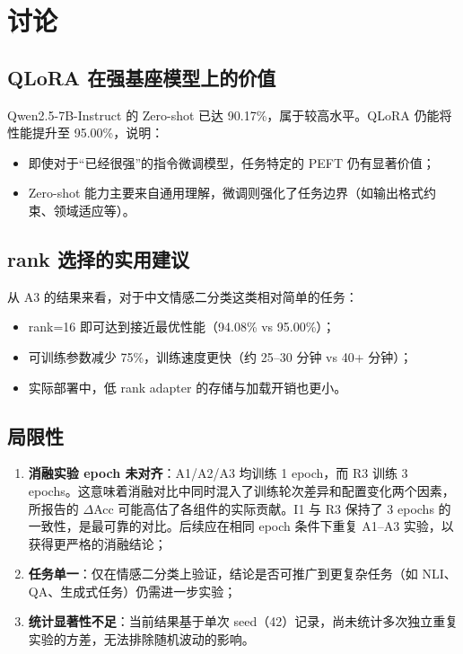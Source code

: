 \documentclass[12pt,a4paper]{article}
\begin{document}
\section{讨论}

\subsection{QLoRA 在强基座模型上的价值}

Qwen2.5-7B-Instruct 的 Zero-shot 已达 90.17\%，属于较高水平。QLoRA 仍能将性能提升至 95.00\%，说明：
\begin{itemize}[leftmargin=2em]
  \item 即使对于``已经很强''的指令微调模型，任务特定的 PEFT 仍有显著价值；
  \item Zero-shot 能力主要来自通用理解，微调则强化了任务边界（如输出格式约束、领域适应等）。
\end{itemize}

\subsection{rank 选择的实用建议}

从 A3 的结果来看，对于中文情感二分类这类相对简单的任务：
\begin{itemize}[leftmargin=2em]
  \item rank=16 即可达到接近最优性能（94.08\% vs 95.00\%）；
  \item 可训练参数减少 75\%，训练速度更快（约 25--30 分钟 vs 40+ 分钟）；
  \item 实际部署中，低 rank adapter 的存储与加载开销也更小。
\end{itemize}

\subsection{局限性}

\begin{enumerate}[leftmargin=2em]
  \item \textbf{消融实验 epoch 未对齐}：A1/A2/A3 均训练 1 epoch，而 R3 训练 3 epochs。这意味着消融对比中同时混入了训练轮次差异和配置变化两个因素，所报告的 $\Delta$Acc 可能高估了各组件的实际贡献。I1 与 R3 保持了 3 epochs 的一致性，是最可靠的对比。后续应在相同 epoch 条件下重复 A1--A3 实验，以获得更严格的消融结论；
  \item \textbf{任务单一}：仅在情感二分类上验证，结论是否可推广到更复杂任务（如 NLI、QA、生成式任务）仍需进一步实验；
  \item \textbf{统计显著性不足}：当前结果基于单次 seed（42）记录，尚未统计多次独立重复实验的方差，无法排除随机波动的影响。
\end{enumerate}
\end{document}
